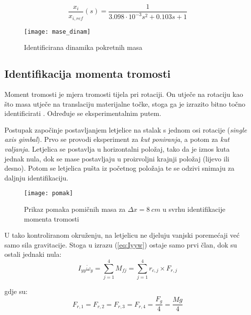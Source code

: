 \documentclass[11pt,a4paper]{article}
\begin{document}
\begin{equation}
\boxed{
\frac{x_{i}}{x_{i, ref}}(s) = \frac{1}{3.098\cdot10^{-3}s^{2} + 0.103 s + 1}
}
\label{eq:mase_tf}
\end{equation}

\begin{figure}[H]
	\centering
	\texttt{[image: mase\_dinam]}
	\caption{Identificirana dinamika pokretnih masa}
	\label{fig:masa_din}
\end{figure}

\subsection{Identifikacija momenta tromosti}

Moment tromosti je mjera tromosti tijela pri rotaciji. On utječe na rotaciju kao što masa utječe na translaciju materijalne točke, stoga ga je izrazito bitno točno identificirati \cite{fiz1}. Određuje se eksperimentalnim putem. 

\medskip

Postupak započinje postavljanjem letjelice na stalak s jednom osi rotacije (\textit{single axis gimbal}). Prvo se provodi eksperiment za \textit{kut poniranja}, a potom za \textit{kut valjanja}. Letjelica se postavlja u horizontalni položaj, tako da je iznos kuta jednak nula, dok se mase postavljaju u proizvoljni krajnji položaj (lijevo ili desno). Potom se letjelica pušta iz početnog položaja te se odzivi snimaju za daljnju identifikaciju. 

\begin{figure}[H]
	\centering
	\texttt{[image: pomak]}
	\caption{Prikaz pomaka pomičnih masa za $\Delta x = 8 \ cm$ u svrhu identifikacije momenta tromosti}
	\label{fig:}
\end{figure}


\medskip

U tako kontroliranom okruženju, na letjelicu ne djeluju vanjski poremećaji već samo sila gravitacije. Stoga u izrazu (\ref{eq:Iyyw}) ostaje samo prvi član, dok su ostali jednaki nula:
\begin{equation}
I_{yy} \dot{\omega}_{y} = \sum_{j=1}^{4} M_{fj}  =  \sum_{j=1}^{4} r_{c,j} \times F_{r,j}
\label{eq:Iyyw2}
\end{equation}

gdje su:
\begin{equation}
F_{r,1} = F_{r,2} = F_{r,3} = F_{r,4} = \frac{F_{g}}{4} = \frac{Mg}{4}
\label{eq:F1234}
\end{equation}
\end{document}
